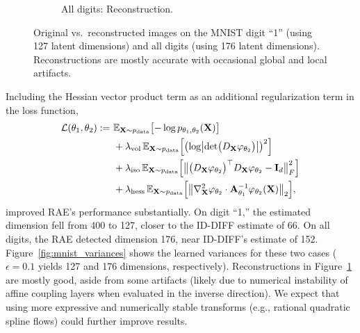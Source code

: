 \begin{figure}[h!]
\begin{subfigure}[b]{0.45\textwidth}
            \caption{\scriptsize All digits: Reconstruction.}
        \end{subfigure}
        \caption{Original vs.\ reconstructed images on the MNIST digit ``1'' (using 127 latent dimensions) and all digits (using 176 latent dimensions). Reconstructions are mostly accurate with occasional global and local artifacts.}
        \label{fig:mnist_reconstructions}
    \end{figure}

    Including the Hessian vector product term as an additional regularization term in the loss function, 
    \begin{align}
        \label{eq:mnist_training_objective}
        \mathcal{L}(\theta_1, \theta_2) :=\ & \mathbb{E}_{\mathbf{X} \sim p_{\text{data}}}\bigl[-\log p_{\theta_1, \theta_2}(\mathbf{X})\bigr] \notag \\
        & + \lambda_{\text{vol}} \, \mathbb{E}_{\mathbf{X} \sim p_{\text{data}}}\Bigl[\bigl(\log \bigl|\det\bigl(D_{\mathbf{X}}\varphi_{\theta_2}\bigr)\bigr|\bigr)^2\Bigr] \notag \\
        & + \lambda_{\text{iso}} \, \mathbb{E}_{\mathbf{X} \sim p_{\text{data}}}\Bigl[\bigl\|\bigl(D_{\mathbf{X}}\varphi_{\theta_2}\bigr)^\top D_{\mathbf{X}}\varphi_{\theta_2} - \mathbf{I}_d\bigr\|_F^2\Bigr] \notag \\
        & + \lambda_{\text{hess}} \, \mathbb{E}_{\mathbf{X} \sim p_{\text{data}}}\Bigl[\bigl\|\nabla^2_{\mathbf{X}}\varphi_{\theta_2} \cdot \mathbf{A}_{\theta_1}^{-1} \varphi_{\theta_2}(\mathbf{X})\bigr\|_2\Bigr],
    \end{align}
    improved RAE's performance substantially. On digit ``1,'' the estimated dimension fell from 400 to 127, closer to the ID-DIFF estimate of 66. On all digits, the RAE detected dimension 176, near ID-DIFF’s estimate of 152. Figure~\ref{fig:mnist_variances} shows the learned variances for these two cases ($\epsilon = 0.1$ yields 127 and 176 dimensions, respectively). Reconstructions in Figure~\ref{fig:mnist_reconstructions} are mostly good, aside from some artifacts (likely due to numerical instability of affine coupling layers when evaluated in the inverse direction). We expect that using more expressive and numerically stable transforms (e.g., rational quadratic spline flows) could further improve results.
    
    
    
    
    
